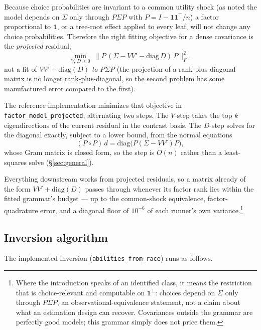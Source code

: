 \documentclass[11pt]{article}
\begin{document}
Because choice probabilities are
invariant to a common utility shock (as noted the model depends on $\Sigma$ only
through $P\Sigma P$ with $P=I-\mathbf{1}\mathbf{1}^{\top}/n$) a factor
proportional to $\mathbf{1}$, or a tree-root effect applied to every leaf, will not change any choice probabilities. Therefore the right fitting objective for a dense covariance
is the {\em projected} residual,
\[
\min_{V,\,D\ge0}\;\bigl\lVert P\,(\Sigma-VV'-\mathrm{diag}\,D)\,P\bigr\rVert_F^2,
\]
not a fit of $VV'+\mathrm{diag}(D)$ \emph{to} $P\Sigma P$ (the projection
of a rank-plus-diagonal matrix is no longer rank-plus-diagonal, so the
second problem has some manufactured error compared to the first).

The reference implementation minimizes that objective in
\texttt{factor\_model\_projected}, alternating two steps. The $V$-step
takes the top $k$ eigendirections of the current residual in the contrast
basis. The $D$-step solves for the diagonal exactly, subject to a lower
bound, from the normal equations
\[
  (P\!\circ\!P)\,d=\mathrm{diag}\bigl(P(\Sigma-VV')P\bigr),
\]
whose Gram matrix is closed form, so the step is $O(n)$ rather than a
least-squares solve (\S\ref{sec:general}).

Everything downstream works from projected residuals, so a matrix
already of the form $VV'+\mathrm{diag}(D)$ passes through whenever its
factor rank lies within the fitted grammar's budget --- up to the
common-shock equivalence, factor-quadrature error, and a diagonal floor
of $10^{-6}$ of each runner's own variance.\footnote{Where
the introduction speaks of an identified class, it means the restriction
that is choice-relevant and computable on $\mathbf{1}^{\perp}$: choices
depend on $\Sigma$ only through $P\Sigma P$, an observational-equivalence
statement, not a claim about what an estimation design can recover.
Covariances outside the grammar are perfectly good models; this grammar
simply does not price them.}

\subsection{Inversion algorithm}

The implemented inversion (\texttt{abilities\_from\_race}) runs as follows.
\end{document}

